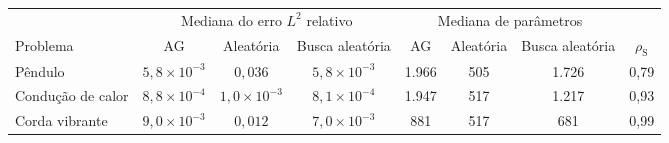 \begin{tabular}{l ccc ccc c}
\toprule
 & \multicolumn{3}{c}{Mediana do erro $L^2$ relativo} & \multicolumn{3}{c}{Mediana de parâmetros} & \\
\cmidrule(lr){2-4}\cmidrule(lr){5-7}
Problema & AG & Aleatória & Busca aleatória & AG & Aleatória & Busca aleatória & $\rho_{\mathrm{S}}$ \\
\midrule
Pêndulo & $5{,}8 \times 10^{-3}$ & $0{,}036$ & $5{,}8 \times 10^{-3}$ & 1.966 & 505 & 1.726 & 0,79 \\
Condução de calor & $8{,}8 \times 10^{-4}$ & $1{,}0 \times 10^{-3}$ & $8{,}1 \times 10^{-4}$ & 1.947 & 517 & 1.217 & 0,93 \\
Corda vibrante & $9{,}0 \times 10^{-3}$ & $0{,}012$ & $7{,}0 \times 10^{-3}$ & 881 & 517 & 681 & 0,99 \\
\bottomrule
\end{tabular}
